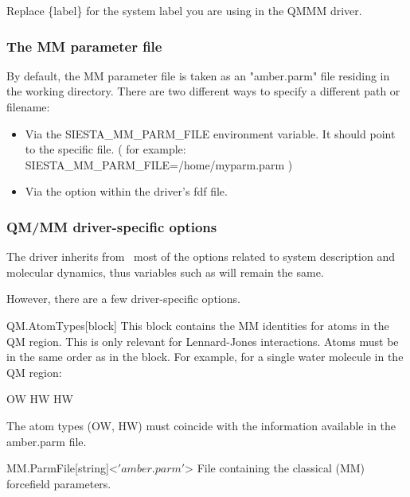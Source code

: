   Replace \{label\} for the system label you are using in the QMMM driver.


  \subsubsection{The MM parameter file}
  By default, the MM parameter file is taken as an "amber.parm" file residing in
  the working directory. There are two different ways to specify a different
  path or filename:

  \begin{itemize}
    \item Via the SIESTA\_MM\_PARM\_FILE environment variable. It should point
          to the specific file. ( for example:
          SIESTA\_MM\_PARM\_FILE=/home/myparm.parm )

    \item Via the  option within the driver's fdf file.
  \end{itemize}

  \subsubsection{QM/MM driver-specific options}
  The driver inherits from \siesta\ most of the options related to system
  description and molecular dynamics, thus variables such as 
  will remain the same.

  However, there are a few driver-specific options.

  \begin{fdfentry}{QM.AtomTypes}[block]
    This block contains the MM identities for atoms in the QM region. This
    is only relevant for Lennard-Jones interactions. Atoms must be in the
    same order as in the  block. For
    example, for a single water molecule in the QM region:

    \begin{shellexample}
        OW
        HW
        HW
    \end{shellexample}

    The atom types (OW, HW) must coincide with the information available in the
    amber.parm file.

  \end{fdfentry}

  \begin{fdfentry}{MM.ParmFile}[string]<$'amber.parm'$>
    File containing the classical (MM) forcefield parameters.
  \end{fdfentry}

